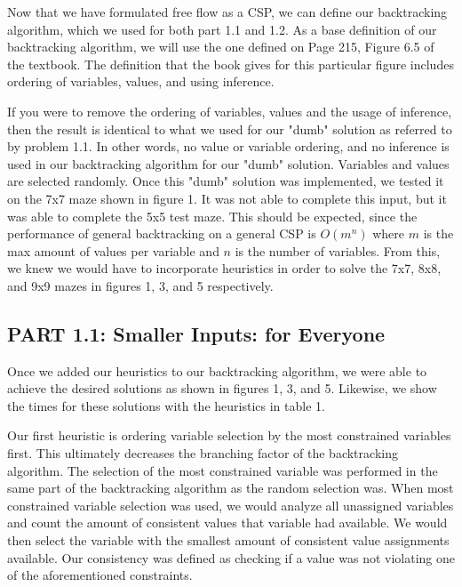 \documentclass[11pt]{article}
\begin{document}
Now that we have formulated free flow as a CSP, we can define our backtracking algorithm, which we used for both part 1.1 and 1.2. As a base definition of our backtracking algorithm, we will use the one defined on Page 215, Figure 6.5 of the textbook. The definition that the book gives for this particular figure includes ordering of variables, values, and using inference.

If you were to remove the ordering of variables, values and the usage of inference, then the result is identical to what we used for our "dumb" solution as referred to by problem 1.1. In other words, no value or variable ordering, and no inference is used in our backtracking algorithm for our "dumb" solution. Variables and values are selected randomly. Once this "dumb" solution was implemented, we tested it on the 7x7 maze shown in figure 1. It was not able to complete this input, but it was able to complete the 5x5 test maze. This should be expected, since the performance of general backtracking on a general CSP is $O(m^n)$ where $m$ is the max amount of values per variable and $n$ is the number of variables. From this, we knew we would have to incorporate heuristics in order to solve the 7x7, 8x8, and 9x9 mazes in figures 1, 3, and 5 respectively.

\pagebreak
\subsection*{PART 1.1: Smaller Inputs: for Everyone}


Once we added our heuristics to our backtracking algorithm, we were able to achieve the desired solutions as shown in figures 1, 3, and 5. Likewise, we show the times for these solutions with the heuristics in table 1.

Our first heuristic is ordering variable selection by the most constrained variables first. This ultimately decreases the branching factor of the backtracking algorithm. The selection of the most constrained variable was performed in the same part of the backtracking algorithm as the random selection was. When most constrained variable selection was used, we would analyze all unassigned variables and count the amount of consistent values that variable had available. We would then select the variable with the smallest amount of consistent value assignments available. Our consistency was defined as checking if a value was not violating one of the aforementioned constraints.
\end{document}
